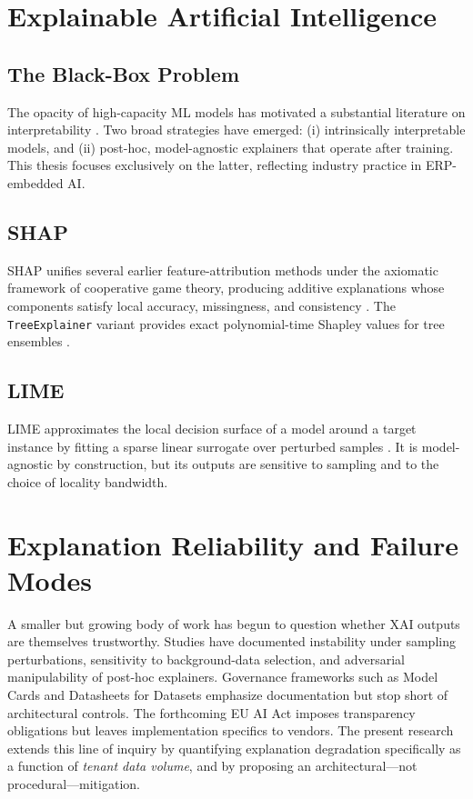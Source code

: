 \section{Explainable Artificial Intelligence}
\label{sec:lit_xai}

\subsection{The Black-Box Problem}
The opacity of high-capacity ML models has motivated a substantial literature on interpretability \citep{lipton2018mythos, rudin2019stop}. Two broad strategies have emerged: (i) intrinsically interpretable models, and (ii) post-hoc, model-agnostic explainers that operate after training. This thesis focuses exclusively on the latter, reflecting industry practice in ERP-embedded AI.

\subsection{SHAP}
SHAP unifies several earlier feature-attribution methods under the axiomatic framework of cooperative game theory, producing additive explanations whose components satisfy local accuracy, missingness, and consistency \citep{lundberg2017unified}. The \texttt{TreeExplainer} variant provides exact polynomial-time Shapley values for tree ensembles \citep{lundberg2020local}.

\subsection{LIME}
LIME approximates the local decision surface of a model around a target instance by fitting a sparse linear surrogate over perturbed samples \citep{ribeiro2016why}. It is model-agnostic by construction, but its outputs are sensitive to sampling and to the choice of locality bandwidth.

\section{Explanation Reliability and Failure Modes}
\label{sec:lit_xai_failure}

A smaller but growing body of work has begun to question whether XAI outputs are themselves trustworthy. Studies have documented instability under sampling perturbations, sensitivity to background-data selection, and adversarial manipulability of post-hoc explainers. Governance frameworks such as Model Cards \citep{mitchell2019model} and Datasheets for Datasets \citep{gebru2021datasheets} emphasize documentation but stop short of architectural controls. The forthcoming EU AI Act \citep{eu2024aiact} imposes transparency obligations but leaves implementation specifics to vendors. The present research extends this line of inquiry by quantifying explanation degradation specifically as a function of \emph{tenant data volume}, and by proposing an architectural---not procedural---mitigation.

